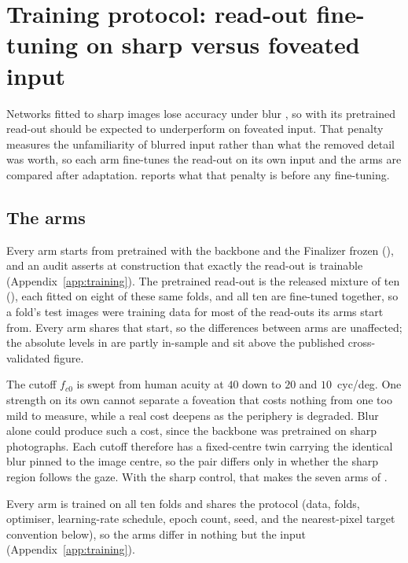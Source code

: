 \section{Training protocol: read-out fine-tuning on sharp versus foveated input}
\label{sec:training}

Networks fitted to sharp images lose accuracy under blur \citep{hendrycks2019robustness}, so \dg{} with
its pretrained read-out should be expected to underperform on foveated input. That penalty
measures the unfamiliarity of blurred input rather than what the removed detail was worth, so each arm
fine-tunes the read-out on its own input and the arms are compared after adaptation.
 reports what that penalty is before any fine-tuning.

\subsection{The arms}
\label{subsec:arms}

Every arm starts from pretrained \dg{} with the backbone and the Finalizer frozen (),
and an audit asserts at construction that exactly the read-out is trainable (Appendix~\ref{app:training}).
The pretrained read-out is the released mixture of ten (), each fitted on eight of these
same folds, and all ten are fine-tuned together, so a fold's test images were training data for most of
the read-outs its arms start from. Every arm shares that start, so the differences between arms are
unaffected; the absolute levels in  are partly in-sample and sit above the published
cross-validated figure.

The cutoff $f_{c0}$ is swept from human acuity at $40$ down to $20$ and $10$~cyc/deg. One strength on
its own cannot separate a foveation that costs nothing from one too mild to measure, while a real cost
deepens as the periphery is degraded. Blur alone could produce such a cost, since the backbone was
pretrained on sharp photographs. Each cutoff therefore has a fixed-centre twin carrying the identical
blur pinned to the image centre, so the pair differs only in whether the sharp region follows the gaze.
With the sharp control, that makes the seven arms of .

Every arm is trained on all ten folds and shares the protocol (data, folds, optimiser, learning-rate
schedule, epoch count, seed, and the nearest-pixel target convention below), so the arms differ in
nothing but the input (Appendix~\ref{app:training}).

